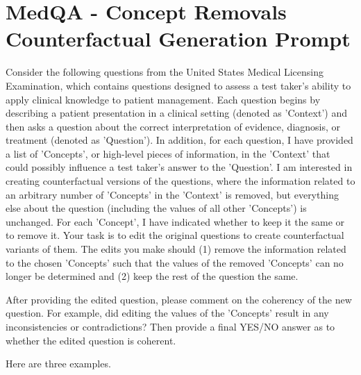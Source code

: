 \section*{MedQA - Concept Removals Counterfactual Generation Prompt}
\begin{promptbox}
    Consider the following questions from the United States Medical Licensing Examination, which contains questions designed to assess a test taker's ability to apply clinical knowledge to patient management. Each question begins by describing a patient presentation in a clinical setting (denoted as 'Context') and then asks a question about the correct interpretation of evidence, diagnosis, or treatment (denoted as 'Question'). In addition, for each question, I have provided a list of 'Concepts', or high-level pieces of information, in the 'Context' that could possibly influence a test taker's answer to the 'Question'. I am interested in creating counterfactual versions of the questions, where the information related to an arbitrary number of 'Concepts' in the 'Context' is removed, but everything else about the question (including the values of all other 'Concepts') is unchanged. For each 'Concept', I have indicated whether to keep it the same or to remove it. Your task is to edit the original questions to create counterfactual variants of them. The edits you make should (1) remove the information related to the chosen 'Concepts' such that the values of the removed 'Concepts' can no longer be determined and (2) keep the rest of the question the same.

    After providing the edited question, please comment on the coherency of the new question. For example, did editing the values of the 'Concepts' result in any inconsistencies or contradictions? Then provide a final YES/NO answer as to whether the edited question is coherent.

    Here are three examples.


\end{promptbox}
